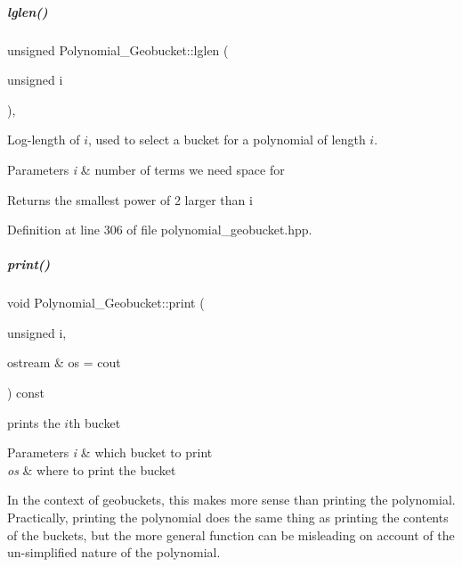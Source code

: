 \mbox{\label{group__polygroup_a82e8a9286f5c30e48c13e05d74af7fb9}} 
\subparagraph{\texorpdfstring{lglen()}{lglen()}}
{\footnotesize\ttfamily unsigned Polynomial\+\_\+\+Geobucket\+::lglen (\begin{DoxyParamCaption}\item[{unsigned}]{i }\end{DoxyParamCaption})\hspace{0.3cm}{\ttfamily [inline]}, {\ttfamily [protected]}}



Log-\/length of $i$, used to select a bucket for a polynomial of length $i$. 


\begin{DoxyParams}{Parameters}
{\em i} & number of terms we need space for \\
\hline
\end{DoxyParams}
\begin{DoxyReturn}{Returns}
the smallest power of 2 larger than i 
\end{DoxyReturn}


Definition at line 306 of file polynomial\+\_\+geobucket.\+hpp.

\mbox{\label{group__polygroup_a672dd35e16935aaa5d5334283eab918e}} 
\subparagraph{\texorpdfstring{print()}{print()}\hspace{0.1cm}{\footnotesize\ttfamily [1/2]}}
{\footnotesize\ttfamily void Polynomial\+\_\+\+Geobucket\+::print (\begin{DoxyParamCaption}\item[{unsigned}]{i,  }\item[{ostream \&}]{os = {\ttfamily cout} }\end{DoxyParamCaption}) const}



prints the $i$th bucket 


\begin{DoxyParams}{Parameters}
{\em i} & which bucket to print \\
\hline
{\em os} & where to print the bucket\\
\hline
\end{DoxyParams}
In the context of geobuckets, this makes more sense than printing the polynomial. Practically, printing the polynomial does the same thing as printing the contents of the buckets, but the more general function can be misleading on account of the un-\/simplified nature of the polynomial. 


